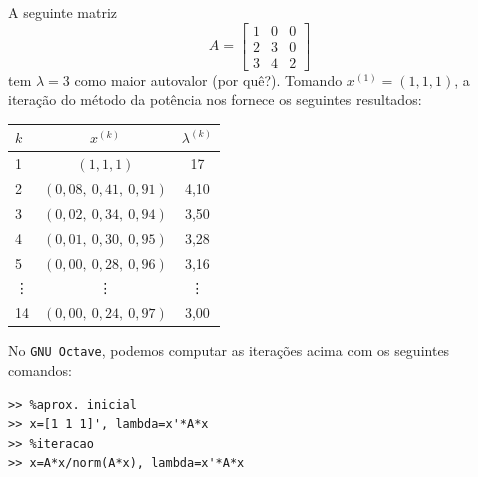 \begin{ex}
  A seguinte matriz
  \begin{equation}
    A =
    \begin{bmatrix}
      1 & 0 & 0\\
      2 & 3 & 0\\
      3 & 4 & 2
    \end{bmatrix}
  \end{equation}
tem $\lambda=3$ como maior autovalor (por quê?). Tomando $x^{(1)} = (1, 1, 1)$, a iteração do método da potência nos fornece os seguintes resultados:
\begin{center}
  \begin{tabular}{l|c|c}
    $k$ & $x^{(k)}$ & $\lambda^{(k)}$\\\hline
    1   & $(1, 1, 1)$ & 17\\
    2   & $(0,08,~0,41,~0,91)$ & 4,10\\
    3   & $(0,02,~0,34,~0,94)$ & 3,50\\
    4   & $(0,01,~0,30,~0,95)$ & 3,28\\
    5   & $(0,00,~0,28,~0,96)$ & 3,16\\
    \vdots & \vdots & \vdots\\
    14  & $(0,00,~0,24,~0,97)$ & 3,00\\\hline
  \end{tabular}
\end{center}

\ifisscilab
\construirScilab
\fi
\ifisoctave
No \verb+GNU Octave+, podemos computar as iterações acima com os seguintes comandos:
\begin{verbatim}
>> %aprox. inicial
>> x=[1 1 1]', lambda=x'*A*x
>> %iteracao
>> x=A*x/norm(A*x), lambda=x'*A*x
\end{verbatim}
\fi
\ifispython
\construirPython
\fi
\end{ex}


